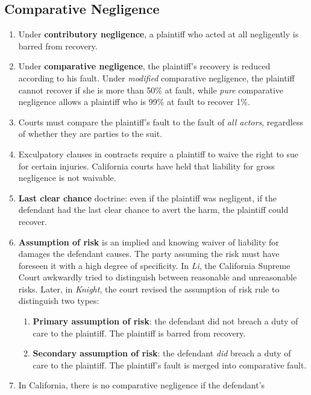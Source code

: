 \subsection{Comparative Negligence}

\begin{enumerate}
    \item Under \textbf{contributory negligence}, a plaintiff who acted at all 
    negligently is barred from recovery.
    \item Under \textbf{comparative negligence}, the plaintiff's recovery is 
    reduced according to his fault. Under \emph{modified} comparative 
    negligence, the plaintiff cannot recover if she is more than 50\% at 
    fault, while \emph{pure} comparative negligence allows a plaintiff who is 
    99\% at fault to recover 1\%.
    \item Courts must compare the plaintiff's fault to the fault of \emph{all 
    actors}, regardless of whether they are parties to the suit.
    \item Exculpatory clauses in contracts require a plaintiff to waive the 
    right to sue for certain injuries. California courts have held that 
    liability for gross negligence is not waivable.
    \item \textbf{Last clear chance} doctrine: even if the plaintiff was 
    negligent, if the defendant had the last clear chance to avert the harm, 
    the plaintiff could recover.
    \item \textbf{Assumption of risk} is an implied and knowing waiver of 
    liability for damages the defendant causes. The party assuming the risk 
    must have foreseen it with a high degree of specificity. In \emph{Li}, the 
    California Supreme Court awkwardly tried to distinguish between reasonable 
    and unreasonable risks. Later, in \emph{Knight}, the court revised the 
    assumption of risk rule to distinguish two types:
    \begin{enumerate}
        \item \textbf{Primary assumption of risk}: the defendant did not 
        breach a duty of care to the plaintiff. The plaintiff is barred from 
        recovery.
        \item \textbf{Secondary assumption of risk}: the defendant \emph{did} 
        breach a duty of care to the plaintiff. The plaintiff's fault is 
        merged into comparative fault.
    \end{enumerate}
    \item In California, there is no comparative negligence if the defendant's 

\end{enumerate}
